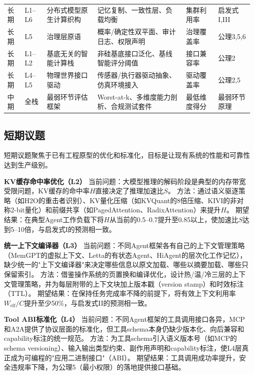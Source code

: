 \begin{longtable}{>{\small}p{}>{\small}p{}>{\small}p{}>{\small}p{}>{\small}p{}>{\small}p{}}
长期 & L1--L6 & 分布式模型原生计算织构 & 记忆复制、一致性层、负载均衡 & 集群利用率 & 启发式I,III \\[3pt]
长期 & L5 & 治理层原语 & 概率/确定性双平面、审计日志、权限声明 & 治理覆盖率 & 公理3,5,6 \\[3pt]
长期 & L1--L2 & 基底无关的智能计算栈 & 非硅基底接口泛化、基线智能评分阈值 & 接口兼容率 & 公理2 \\[3pt]
长期 & L4--L5 & 物理世界接口驱动 & 传感器/执行器驱动抽象、仿真环境接入 & 驱动覆盖率 & 公理2,5 \\[3pt]
中期 & 全栈 & 最弱环节评估框架 & Worst-at-k、多维度能力剖析、合规测试套件 & 最低维度得分 & 最弱环节原理 \\
\bottomrule
\end{longtable}
\renewcommand{\arraystretch}{1.0}
\normalsize



\subsection{短期议题}

短期议题聚焦于已有工程原型的优化和标准化，目标是让现有系统的性能和可靠性达到生产级别。

\textbf{KV缓存命中率优化（L2）}
当前问题：大模型推理的解码阶段是典型的内存带宽受限问题\cite{gholami2024memorywall}，KV缓存的命中率$H$直接决定了推理加速比$S$。
方法：通过语义驱逐策略（如H2O的重击者识别\cite{h2o2023}）、KV量化压缩（如KVQuant的8倍压缩\cite{hooper2024kvquant}、KIVI的非对称2-bit量化\cite{liu2024kivi}）和前缀共享（如PagedAttention\cite{kwon2023pagedattention}、RadixAttention\cite{sglang2024}）来提升$H$。
期望结果：在典型Agent工作负载下将$H$从当前的0.5--0.7提升至0.85以上，使加速比$S$达到5--10倍，与启发式I的预测相一致。

\textbf{统一上下文编译器（L3）}
当前问题：不同Agent框架各有自己的上下文管理策略（MemGPT的虚拟上下文、Letta的有状态Agent、HiAgent的层次化工作记忆\cite{memgpt2023,letta_stateful_2026,hiagent2024}），缺少统一的"上下文编译器"来决定哪些信息以原文加载、哪些以摘要加载、哪些只保留索引。
方法：借鉴操作系统的页置换和编译优化，设计热/温/冷三层的上下文管理策略，并为每层附带的上下文块加上版本戳（version stamp）和时效标注（TTL）。
期望结果：在保持任务完成率不降的前提下，将有效上下文利用率$W_{\mathrm{eff}}/C$提升至少50\%，与启发式II的预测相一致。

\textbf{Tool ABI标准化（L4）}
当前问题：不同Agent框架的工具调用接口各异，MCP和A2A提供了协议层面的标准化，但工具schema本身仍缺少版本化、向后兼容和capability标注的统一规范\cite{mcp_intro_2026,agentprotocols2025}。
方法：为工具schema引入语义版本号（如MCP的schema versioning）、输入输出类型约束、副作用声明和capability标注，使L4层真正成为可编程的"应用二进制接口"（ABI）。
期望结果：工具调用成功率提升，安全违规率下降，为公理5（最小权限）的落地提供接口基础。

